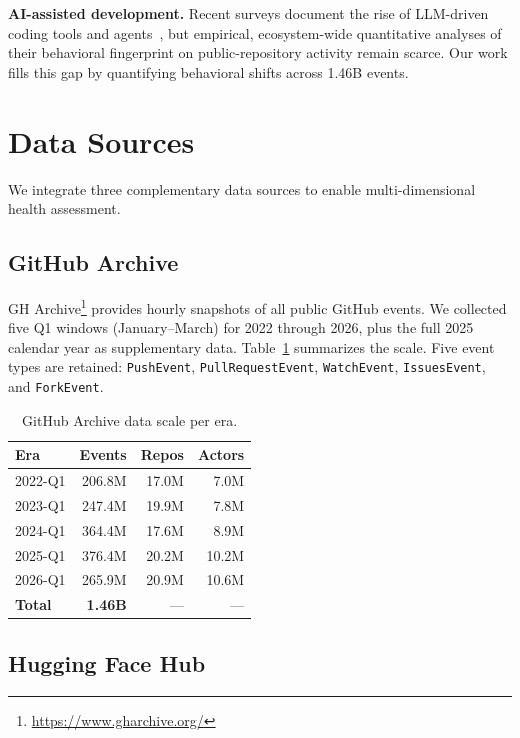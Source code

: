 \documentclass[11pt,twocolumn]{article}
\begin{document}
\textbf{AI-assisted development.}
Recent surveys document the rise of LLM-driven coding tools and agents~\cite{fan2023}, but empirical, ecosystem-wide quantitative analyses of their behavioral fingerprint on public-repository activity remain scarce.
Our work fills this gap by quantifying behavioral shifts across 1.46B events.

\section{Data Sources}\label{sec:data}

We integrate three complementary data sources to enable multi-dimensional health assessment.

\subsection{GitHub Archive}

GH Archive\footnote{\url{https://www.gharchive.org/}} provides hourly snapshots of all public GitHub events.
We collected five Q1 windows (January--March) for 2022 through 2026, plus the full 2025 calendar year as supplementary data.
Table~\ref{tab:data-scale} summarizes the scale.
Five event types are retained: \texttt{PushEvent}, \texttt{PullRequestEvent}, \texttt{WatchEvent}, \texttt{IssuesEvent}, and \texttt{ForkEvent}.

\begin{table}[t]
\centering\small
\caption{GitHub Archive data scale per era.}\label{tab:data-scale}
\begin{tabular}{@{}lrrr@{}}
\toprule
\textbf{Era} & \textbf{Events} & \textbf{Repos} & \textbf{Actors} \\
\midrule
2022-Q1 & 206.8M & 17.0M & 7.0M \\
2023-Q1 & 247.4M & 19.9M & 7.8M \\
2024-Q1 & 364.4M & 17.6M & 8.9M \\
2025-Q1 & 376.4M & 20.2M & 10.2M \\
2026-Q1 & 265.9M & 20.9M & 10.6M \\
\midrule
\textbf{Total} & \textbf{1.46B} & --- & --- \\
\bottomrule
\end{tabular}
\end{table}

\subsection{Hugging Face Hub}
\end{document}
